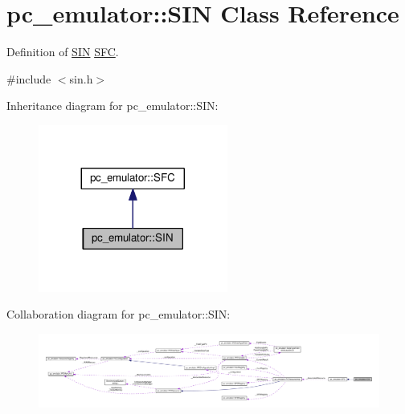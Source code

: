 \hypertarget{classpc__emulator_1_1SIN}{}\section{pc\+\_\+emulator\+:\+:S\+IN Class Reference}
\label{classpc__emulator_1_1SIN}


Definition of \hyperlink{classpc__emulator_1_1SIN}{S\+IN} \hyperlink{classpc__emulator_1_1SFC}{S\+FC}.  




{\ttfamily \#include $<$sin.\+h$>$}



Inheritance diagram for pc\+\_\+emulator\+:\+:S\+IN\+:\nopagebreak
\begin{figure}[H]
\begin{center}
\leavevmode
\includegraphics[width=176pt]{classpc__emulator_1_1SIN__inherit__graph}
\end{center}
\end{figure}


Collaboration diagram for pc\+\_\+emulator\+:\+:S\+IN\+:\nopagebreak
\begin{figure}[H]
\begin{center}
\leavevmode
\includegraphics[width=350pt]{classpc__emulator_1_1SIN__coll__graph}
\end{center}
\end{figure}
